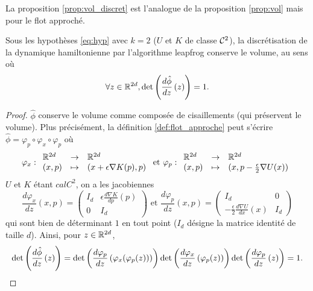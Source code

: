 \documentclass[10pt,a4paper]{article}
\begin{document}
La proposition \ref{prop:vol_discret} est l'analogue de la proposition \ref{prop:vol} mais pour le flot approché.

\begin{Prop}\label{prop:vol_discret}	
	Sous les hypothèses \eqref{eq:hyp} avec $k = 2$ ($U$ et $K$ de classe $\mathcal{C}^2$), la discrétisation de la dynamique hamiltonienne par l'algorithme leapfrog conserve le volume, au sens où
	$$
	\forall z \in \mathbb{R}^{2d}, \det \left( \frac{d \hat \phi}{d z} \left( z \right) \right) = 1.
	$$
\end{Prop}
\begin{proof}
	$\hat \phi$ conserve le volume comme composée de cisaillements (qui préservent le volume). Plus précisément, la définition \ref{def:flot_approche} peut s'écrire $\hat \phi= \varphi_p \circ \varphi_x \circ \varphi_p$ où
	$$
	\varphi_x : { \begin{array}{lcl} 
		\mathbb{R}^{2d} & \to & \mathbb{R}^{2d} \\
		(x,p) & \mapsto & (x + \epsilon \nabla K(p),p)
	 \end{array} }
	\text{ et }
	\varphi_p : { \begin{array}{lcl} 
		\mathbb{R}^{2d} & \to & \mathbb{R}^{2d} \\
		(x,p) & \mapsto & (x,p - \frac \epsilon 2 \nabla U(x))
	 \end{array} }
	$$
	$U$ et $K$ étant $calC^2$, on a les jacobiennes
	$$
	\frac{d\varphi_x}{dz}(x,p) =
	\begin{pmatrix}
	I_d & \epsilon \frac{d\nabla K}{dp}(p) \\
	0 & I_d
	\end{pmatrix}
	\text{ et }
	\frac{d\varphi_p}{dz}(x,p) =
	\begin{pmatrix}
	I_d & 0 \\
	- \frac \epsilon 2 \frac{d\nabla U}{dx}(x) & I_d
	\end{pmatrix}
	$$
	qui sont bien de déterminant $1$ en tout point ($I_d$ désigne la matrice identité de taille $d$). Ainsi, pour $z \in \mathbb{R}^{2d}$,
	$$
	\det \left( \frac{d \hat \phi}{d z} \left( z \right) \right) = \det \left( \frac{d \varphi_p}{d z} \left( \varphi_x(\varphi_p(z)) \right) \right) \det \left( \frac{d \varphi_x}{d z} \left( \varphi_p(z) \right) \right) \det \left( \frac{d \varphi_p}{d z} \left( z \right) \right) = 1.
	$$
\end{proof}
\end{document}
